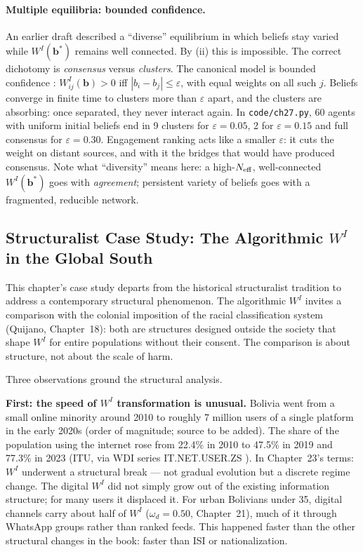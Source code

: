 \documentclass[../structural_economics_book.tex]{subfiles}
\begin{document}
\paragraph{Multiple equilibria: bounded confidence.} An earlier draft described a ``diverse'' equilibrium in which beliefs stay varied while $W^I(\mathbf{b}^*)$ remains well connected. By (ii) this is impossible. The correct dichotomy is \emph{consensus} versus \emph{clusters}. The canonical model is bounded confidence \citep{hegselmann2002opinion,deffuant2000mixing}: $W^I_{ij}(\mathbf{b}) > 0$ iff $|b_i - b_j| \le \varepsilon$, with equal weights on all such $j$. Beliefs converge in finite time to clusters more than $\varepsilon$ apart, and the clusters are absorbing: once separated, they never interact again. In \texttt{code/ch27.py}, 60 agents with uniform initial beliefs end in 9 clusters for $\varepsilon = 0.05$, 2 for $\varepsilon = 0.15$ and full consensus for $\varepsilon = 0.30$. Engagement ranking acts like a smaller $\varepsilon$: it cuts the weight on distant sources, and with it the bridges that would have produced consensus. Note what ``diversity'' means here: a high-$N_{\text{eff}}$, well-connected $W^I(\mathbf{b}^*)$ goes with \emph{agreement}; persistent variety of beliefs goes with a fragmented, reducible network.


\subsection*{Structuralist Case Study: The Algorithmic $W^I$ in the Global South}

This chapter's case study departs from the historical structuralist tradition to address a contemporary structural phenomenon. The algorithmic $W^I$ invites a comparison with the colonial imposition of the racial classification system (Quijano, Chapter~18): both are structures designed outside the society that shape $W^I$ for entire populations without their consent. The comparison is about structure, not about the scale of harm.

Three observations ground the structural analysis.

\textbf{First: the speed of $W^I$ transformation is unusual.} Bolivia went from a small online minority around 2010 to roughly 7 million users of a single platform in the early 2020s (order of magnitude; source to be added). The share of the population using the internet rose from 22.4\% in 2010 to 47.5\% in 2019 and 77.3\% in 2023 (ITU, via WDI series IT.NET.USER.ZS \citep{worldbank2026wdi}). In Chapter~23's terms: $W^I$ underwent a structural break --- not gradual evolution but a discrete regime change. The digital $W^I$ did not simply grow out of the existing information structure; for many users it displaced it. For urban Bolivians under 35, digital channels carry about half of $W^I$ ($\omega_d = 0.50$, Chapter~21), much of it through WhatsApp groups rather than ranked feeds. This happened faster than the other structural changes in the book: faster than ISI or nationalization.
\end{document}
